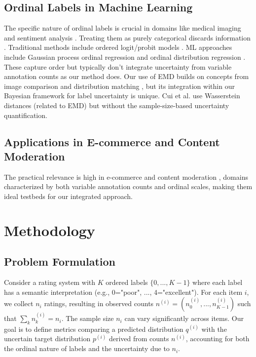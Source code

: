 \documentclass[journal]{IEEEtran}
\begin{document}
\subsection{Ordinal Labels in Machine Learning}
The specific nature of ordinal labels is crucial in domains like medical imaging \cite{cheplygina2018} and sentiment analysis \cite{alm2011}. Treating them as purely categorical discards information \cite{manning2011, zeman2010}. Traditional methods include ordered logit/probit models \cite{mccullagh1980}. ML approaches include Gaussian process ordinal regression \cite{chu2005} and ordinal distribution regression \cite{seeger2021}. These capture order but typically don't integrate uncertainty from variable annotation counts as our method does. Our use of EMD builds on concepts from image comparison \cite{levina2001} and distribution matching \cite{cui2020}, but its integration within our Bayesian framework for label uncertainty is unique. Cui et al. \cite{cui2020} use Wasserstein distances (related to EMD) but without the sample-size-based uncertainty quantification.

\subsection{Applications in E-commerce and Content Moderation}
The practical relevance is high in e-commerce \cite{liu2016} and content moderation \cite{cercas2021}, domains characterized by both variable annotation counts and ordinal scales, making them ideal testbeds for our integrated approach.

\section{Methodology}

\subsection{Problem Formulation}
Consider a rating system with $K$ ordered labels $\{0,...,K-1\}$ where each label has a semantic interpretation (e.g., 0="poor", ..., 4="excellent"). For each item $i$, we collect $n_i$ ratings, resulting in observed counts $n^{(i)} = (n_0^{(i)}, ..., n_{K-1}^{(i)})$ such that $\sum_k n_k^{(i)} = n_i$. The sample size $n_i$ can vary significantly across items. Our goal is to define metrics comparing a predicted distribution $q^{(i)}$ with the uncertain target distribution $p^{(i)}$ derived from counts $n^{(i)}$, accounting for both the ordinal nature of labels and the uncertainty due to $n_i$.
\end{document}
